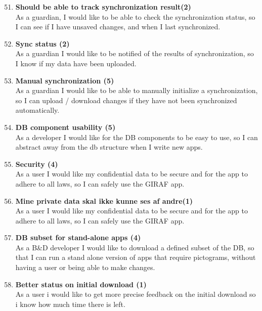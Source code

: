 \begin{enumerate}
	\setcounter{enumi}{50} %
	\item \textbf{Should be able to track synchronization result(2)}\\
	As a guardian, I would like to be able to check the synchronization status, so I can see if I have unsaved changes, and when I last synchronized.
	
	\item \textbf{Sync status (2)} \\
	As a guardian I would like to be notified of the results of synchronization, so I know if my data have been uploaded.
	
	\item \textbf{Manual synchronization (5)}\\
	As a guardian I would like to be able to manually initialize a synchronization, so I can upload / download changes if they have not been synchronized automatically. 
	
	\item \textbf{DB component usability (5)}\\
	As a developer I would like for the DB components to be easy to use, so I can abstract away from the db structure when I write new apps. 
	
	\item \textbf{Security (4)}\\
	As a user I would like my confidential data to be secure and for the app to adhere to all laws, so I can safely use the GIRAF app.
	
	\item \textbf{Mine private data skal ikke kunne ses af andre(1)}\\
	As a user I would like my confidential data to be secure and for the app to adhere to all laws, so I can safely use the GIRAF app. 
	
	\item \textbf{DB subset for stand-alone apps (4)}\\
	As a B\&D developer I would like to download a defined subset of the DB, so that I can run a stand alone version of apps that require pictograms, without having a user or being able to make changes.  
	
	\item \textbf{Better status on initial download (1)}\\
	As a user i would like to get more precise feedback on the initial download so i know how much time there is left.
	

\end{enumerate}
